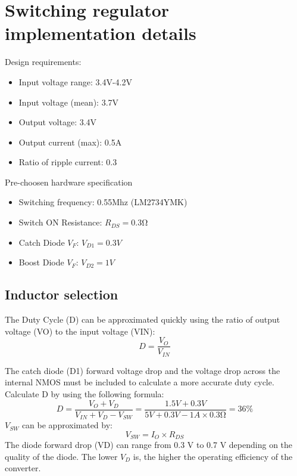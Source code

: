 \documentclass[./main.tex]{subfiles}
\begin{document}
\chapter{Switching regulator implementation details}

Design requirements:
\begin{itemize}
    \item Input voltage range: 3.4V-4.2V
    \item Input voltage (mean): 3.7V
    \item Output voltage: 3.4V
    \item Output current (max): 0.5A
    \item Ratio of ripple current: 0.3
\end{itemize}

\noindent Pre-choosen hardware specification
\begin{itemize}
    \item Switching frequency: 0.55Mhz (LM2734YMK)
    \item Switch ON Resistance: $R_{DS} = 0.3 \si{\ohm}$ 
    \item Catch Diode $V_F$: $V_{D1} = 0.3V$
    \item Boost Diode $V_F$: $V_{D2} = 1V$
\end{itemize}

\section{Inductor selection}
The Duty Cycle (D) can be approximated quickly using the ratio of output voltage (VO) to the input voltage (VIN):
\begin{equation}
    D = \frac{V_O}{V_{IN}}
\end{equation}

The catch diode (D1) forward voltage drop and the voltage drop across the internal NMOS must be included to calculate a more accurate duty cycle. Calculate D by using the following formula:
\begin{equation}
    D = \frac{V_O + V_{D}}{V_{IN} + V_{D} - V_{SW}}
    = \frac{1.5V + 0.3V}{5V + 0.3V - 1A \times 0.3\si{\ohm}} = 36\%
\end{equation}
$V_{SW}$ can be approximated by:
\begin{equation}
    V_{SW} = I_O \times R_{DS}
\end{equation}
The diode forward drop (VD) can range from 0.3 V to 0.7 V depending on the quality of the diode. The lower $V_D$ is, the higher the operating efficiency of the converter.
\end{document}
